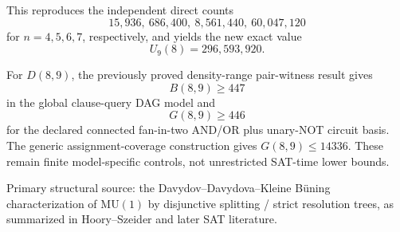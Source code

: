 This reproduces the independent direct counts
\[
15{,}936,\ 686{,}400,\ 8{,}561{,}440,\ 60{,}047{,}120
\]
for \(n=4,5,6,7\), respectively, and yields the new exact value
\[
\boxed{U_9(8)=296{,}593{,}920}.
\]

For \(D(8,9)\), the previously proved density-range pair-witness result gives
\[
B(8,9)\ge447
\]
in the global clause-query DAG model and
\[
G(8,9)\ge446
\]
for the declared connected fan-in-two AND/OR plus unary-NOT circuit basis. The generic
assignment-coverage construction gives \(G(8,9)\le14336\). These remain finite
model-specific controls, not unrestricted SAT-time lower bounds.

Primary structural source: the Davydov--Davydova--Kleine B\"uning characterization of
\(\mathrm{MU}(1)\) by disjunctive splitting / strict resolution trees, as summarized in
Hoory--Szeider and later SAT literature.

